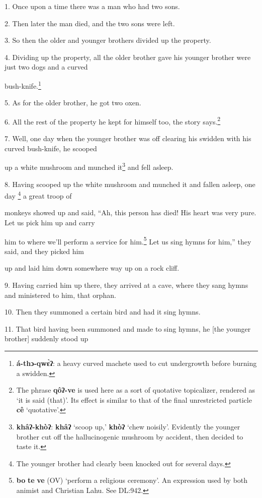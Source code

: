 \setcounter{footnote}{0}

1. Once upon a time there was a man who had two sons.

2. Then later the man died, and the two sons were left.

3. So then the older and younger brothers divided up the property.

4. Dividing up the property, all the older brother gave his younger brother were
just two dogs and a curved

bush-knife.\footnote{\textbf{á-thɔ-qwɛ̀ʔ}: a heavy curved machete used to cut undergrowth before burning a swidden.}

5. As for the older brother, he got two oxen.

6. All the rest of the property he kept for himself too, the story says.\footnote{The phrase \textbf{qôʔ-ve} is used here as a sort of quotative topicalizer, rendered as `it is said (that)'. Its effect is similar to that of the final unrestricted particle \textbf{cê} `quotative'.}

7. Well, one day when the younger brother was off clearing his swidden with his
curved bush-knife, he scooped

up a white mushroom and munched it\footnote{\textbf{khâʔ-khòʔ}: \textbf{khâʔ} `scoop up,' \textbf{khòʔ} `chew noisily'. Evidently the younger brother cut off the hallucinogenic mushroom by accident, then decided to taste it.} and fell asleep.

8. Having scooped up the white mushroom and munched it and fallen asleep, one day
\footnote{The younger brother had clearly been knocked out for several days.} a great troop of

monkeys showed up and said, ``Ah, this person has died! His heart was very pure.
Let us pick him up and carry

him to where we'll perform a service for him.\footnote{\textbf{bo} \textbf{te} \textbf{ve} (OV) `perform a religious ceremony'. An expression used by both animist and Christian Lahu. See DL:942.} Let us sing hymns for him,''
they said, and they picked him

up and laid him down somewhere way up on a rock cliff.

9. Having carried him up there, they arrived at a cave, where they sang hymns and
ministered to him, that orphan.

10. Then they summoned a certain bird and had it sing hymns.

11. That bird having been summoned and made to sing hymns, he [the younger brother]
suddenly stood up

